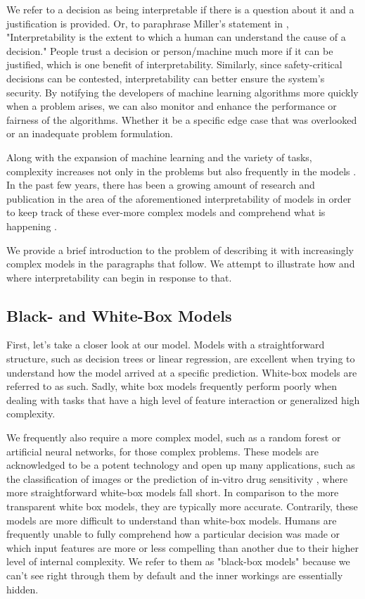\documentclass[11pt,
  a4paper,
  parskip=half, %
  BCOR=10mm, %
  english,
  ]{article}
\begin{document}
We refer to a decision as being interpretable if there is a question about it and a justification is provided.
Or, to paraphrase Miller's statement in \cite{DBLP:journals/corr/Miller17a}, 
"Interpretability is the extent to which a human can understand the cause of a decision."
People trust a decision or person/machine much more if it can be justified, which is one benefit of interpretability.
Similarly, since safety-critical decisions can be contested, interpretability can better ensure the system's security. 
By notifying the developers of machine learning algorithms more quickly when a problem arises, we can also monitor and enhance the performance or fairness of the algorithms.
Whether it be a specific edge case that was overlooked or an inadequate problem formulation.

Along with the expansion of machine learning and the variety of tasks, complexity increases not only in the problems but also frequently in the models \cite{Goodfellow-et-al-2016}.
In the past few years, there has been a growing amount of research and publication in the area of the aforementioned interpretability of models in order to keep track of these ever-more complex models and comprehend what is happening \cite{molnar2022}. 

We provide a brief introduction to the problem of describing it with increasingly complex models in the paragraphs that follow.
We attempt to illustrate how and where interpretability can begin in response to that. 


\subsection{Black- and White-Box Models}
First, let's take a closer look at our model.
Models with a straightforward structure, such as decision trees or linear regression, are excellent when trying to understand how the model arrived at a specific prediction.
White-box models are referred to as such.
Sadly, white box models frequently perform poorly when dealing with tasks that have a high level of feature interaction or generalized high complexity. 

We frequently also require a more complex model, such as a random forest or artificial neural networks, for those complex problems.
These models are acknowledged to be a potent technology and open up many applications, such as the classification of images \cite{resNEt} or the prediction of in-vitro drug sensitivity \cite{drugPredictionRandomForest}, where more straightforward white-box models fall short.
In comparison to the more transparent white box models, they are typically more accurate. 
Contrarily, these models are more difficult to understand than white-box models.
Humans are frequently unable to fully comprehend how a particular decision was made or which input features are more or less compelling than another due to their higher level of internal complexity.
We refer to them as "black-box models" because we can't see right through them by default and the inner workings are essentially hidden.
\end{document}
